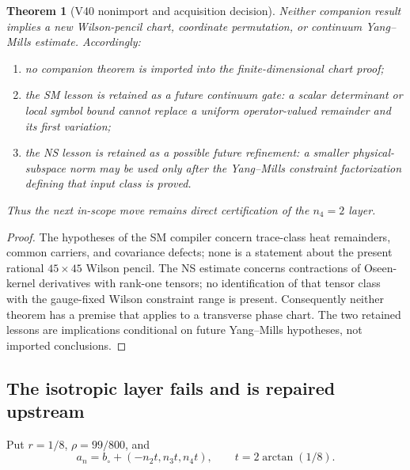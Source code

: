 \documentclass[11pt,oneside]{article}
\newtheorem{theorem}{Theorem}[section]
\theoremstyle{definition}
\theoremstyle{remark}
\begin{document}
\begin{theorem}[V40 nonimport and acquisition decision]
\label{thm:newv40-audit-decision}
Neither companion result implies a new Wilson-penc\-il chart,
coordinate permutation, or continuum Yang--Mills estimate.
Accordingly:
\begin{enumerate}
\item no companion theorem is imported into the finite-dimensional
      chart proof;
\item the SM lesson is retained as a future continuum gate: a
      scalar determinant or local symbol bound cannot replace a
      uniform operator-valued remainder and its first variation;
\item the NS lesson is retained as a possible future refinement:
      a smaller physical-subspace norm may be used only after the
      Yang--Mills constraint factorization defining that input class
      is proved.
\end{enumerate}
Thus the next in-scope move remains direct certification of the
\(n_4=2\) layer.
\end{theorem}

\begin{proof}
The hypotheses of the SM compiler concern trace-class heat
remainders, common carriers, and covariance defects; none is a
statement about the present rational \(45\times45\) Wilson pencil.
The NS estimate concerns contractions of Oseen-kernel derivatives
with rank-one tensors; no identification of that tensor class with
the gauge-fixed Wilson constraint range is present.  Consequently
neither theorem has a premise that applies to a transverse phase
chart.  The two retained lessons are implications conditional on
future Yang--Mills hypotheses, not imported conclusions.
\end{proof}

\subsection{The isotropic layer fails and is repaired upstream}

Put \(r=1/8\), \(\rho=99/800\), and
\[
 a_n=b_\circ+(-n_2t,n_3t,n_4t),\qquad
 t=2\arctan(1/8).                                      \tag{40.3}
\]
\end{document}
